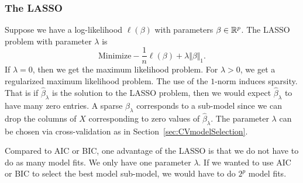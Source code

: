 \subsubsection*{The LASSO}

Suppose we have a log-likelihood $\ell(\beta)$ with parameters $\beta \in \mathbb{R}^p$. The LASSO problem with parameter $\lambda$ is
\[\mbox{Minimize} -\frac{1}{n}\ell(\beta) + \lambda \Vert \beta \Vert_1.\]
If $\lambda = 0$, then we get the maximum likelihood problem. For $\lambda > 0$, we get a regularized maximum likelihood problem. The use of the $1$-norm induces sparsity. That is if $\hat{\beta}_\lambda$ is the solution to the LASSO problem, then we would expect $\hat{\beta}_\lambda$ to have many zero entries. A sparse $\hat{\beta}_\lambda$ corresponds to a sub-model since we can drop the columns of $X$ corresponding to zero values of $\hat{\beta}_\lambda$. The parameter $\lambda$ can be chosen via cross-validation as in Section~\ref{sec:CVmodelSelection}. 

Compared to AIC or BIC, one advantage of the LASSO is that we do not have to do as many model fits. We only have one parameter $\lambda$. If we wanted to use AIC or BIC to select the best model sub-model, we would have to do $2^p$ model fits. 


